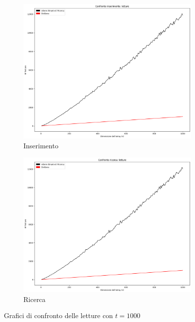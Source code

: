 \begin{figure}[H]
    \centering
    \begin{subfigure}[b]{0.49\textwidth}
        \centering
        \includegraphics[width=\textwidth]{comparison-graphs/insert-r-t1000.png}
        \caption{Inserimento}
        \label{fig:compgraphinsertread1000}
    \end{subfigure}
    \hfill
    \begin{subfigure}[b]{0.49\textwidth}
        \centering
        \includegraphics[width=\textwidth]{comparison-graphs/search-r-t1000.png}
        \caption{Ricerca}
        \label{fig:compgraphsearchread1000}
    \end{subfigure}
    \caption{Grafici di confronto delle letture con $t=1000$}
    \label{fig:compgraphread1000}
\end{figure}

